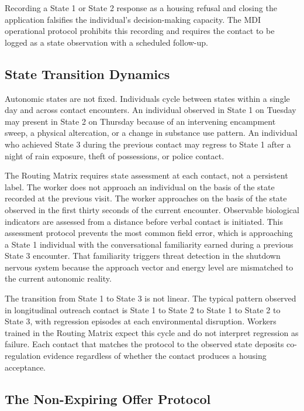 \documentclass[12pt, letterpaper]{article}
\begin{document}
Recording a State 1 or State 2 response as a housing refusal and closing the application falsifies the individual's decision-making capacity. The MDI operational protocol prohibits this recording and requires the contact to be logged as a state observation with a scheduled follow-up.

\subsection{State Transition Dynamics}

Autonomic states are not fixed. Individuals cycle between states within a single day and across contact encounters. An individual observed in State 1 on Tuesday may present in State 2 on Thursday because of an intervening encampment sweep, a physical altercation, or a change in substance use pattern. An individual who achieved State 3 during the previous contact may regress to State 1 after a night of rain exposure, theft of possessions, or police contact.

The Routing Matrix requires state assessment at each contact, not a persistent label. The worker does not approach an individual on the basis of the state recorded at the previous visit. The worker approaches on the basis of the state observed in the first thirty seconds of the current encounter. Observable biological indicators are assessed from a distance before verbal contact is initiated. This assessment protocol prevents the most common field error, which is approaching a State 1 individual with the conversational familiarity earned during a previous State 3 encounter. That familiarity triggers threat detection in the shutdown nervous system because the approach vector and energy level are mismatched to the current autonomic reality.

The transition from State 1 to State 3 is not linear. The typical pattern observed in longitudinal outreach contact is State 1 to State 2 to State 1 to State 2 to State 3, with regression episodes at each environmental disruption. Workers trained in the Routing Matrix expect this cycle and do not interpret regression as failure. Each contact that matches the protocol to the observed state deposits co-regulation evidence regardless of whether the contact produces a housing acceptance.

\subsection{The Non-Expiring Offer Protocol}
\end{document}
